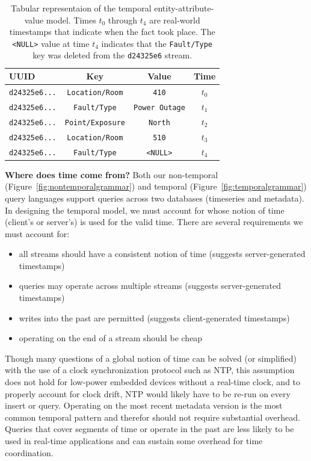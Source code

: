 \begin{table}
\centering
\begin{tabular}{|l|c|c|c|}
\hline
\textbf{UUID} & \textbf{Key} & \textbf{Value} & \textbf{Time} \\
\hline
\texttt{d24325e6...} & \texttt{Location/Room} & \texttt{410} & $t_0$ \\
\texttt{d24325e6...} & \texttt{Fault/Type} & \texttt{Power Outage} & $t_1$ \\
\texttt{d24325e6...} & \texttt{Point/Exposure} & \texttt{North} & $t_2$ \\
\texttt{d24325e6...} & \texttt{Location/Room} & \texttt{510} & $t_3$ \\
\texttt{d24325e6...} & \texttt{Fault/Type} & \texttt{<NULL>} & $t_4$ \\
\hline
\end{tabular}
\caption{Tabular representaion of the temporal entity-attribute-value model. Times $t_0$ through $t_4$ are real-world timestamps
that indicate when the fact took place. The \texttt{<NULL>} value at time $t_4$ indicates that the \texttt{Fault/Type} key was deleted
from the \texttt{d24325e6} stream.}
\label{table:temporaleavexample}
\end{table}

\textbf{Where does time come from?}
Both our non-temporal (Figure~\ref{fig:nontemporalgrammar}) and temporal
(Figure~\ref{fig:temporalgrammar}) query languages support queries across two
databases (timeseries and metadata). In designing the temporal model, we must
account for whose notion of time (client's or server's) is used for the valid
time. There are several requirements we must account for:

\begin{itemize}
\item all streams should have a consistent notion of time (suggests server-generated timestamps)
\item queries may operate across multiple streams (suggests server-generated timestamps)
\item writes into the past are permitted (suggests client-generated timestamps)
\item operating on the end of a stream should be cheap
\end{itemize}

Though many questions of a global notion of time can be solved (or simplified)
with the use of a clock synchronization protocol such as NTP, this assumption
does not hold for low-power embedded devices without a real-time clock, and to
properly account for clock drift, NTP would likely have to be re-run on every
insert or query. Operating on the most recent metadata version is the most
common temporal pattern and therefor should not require substantial overhead.
Queries that cover segments of time or operate in the past are less likely to
be used in real-time applications and can sustain some overhead for time
coordination.


